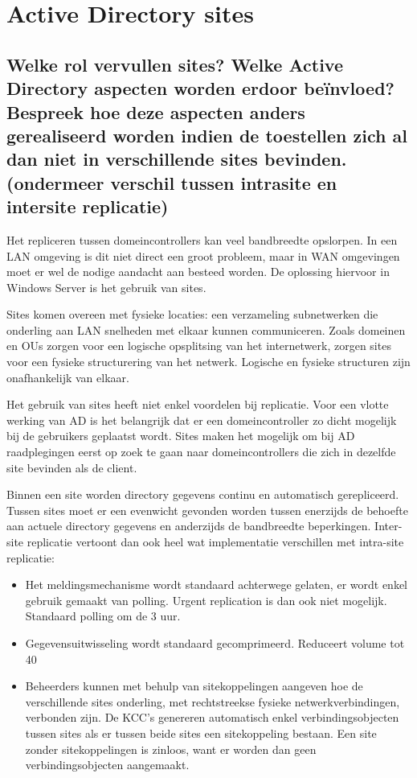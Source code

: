 \chapter{Active Directory sites}

\section{Welke rol vervullen sites? Welke Active Directory aspecten worden
erdoor beïnvloed? Bespreek hoe deze aspecten anders gerealiseerd worden indien
de toestellen zich al dan niet in verschillende sites bevinden. (ondermeer
verschil tussen intrasite en intersite replicatie)}

Het repliceren tussen domeincontrollers kan veel bandbreedte opslorpen. In een
LAN omgeving is dit niet direct een groot probleem, maar in WAN omgevingen moet
er wel de nodige aandacht aan besteed worden. De oplossing hiervoor in Windows
Server is het gebruik van sites.

Sites komen overeen met fysieke locaties: een verzameling subnetwerken die
onderling aan LAN snelheden met elkaar kunnen communiceren. Zoals domeinen en
OUs zorgen voor een logische opsplitsing van het internetwerk, zorgen sites voor
een fysieke structurering van het netwerk. Logische en fysieke structuren zijn
onafhankelijk van elkaar.

Het gebruik van sites heeft niet enkel voordelen bij replicatie. Voor een vlotte
werking van AD is het belangrijk dat er een domeincontroller zo dicht mogelijk
bij de gebruikers geplaatst wordt. Sites maken het mogelijk om bij AD
raadplegingen eerst op zoek te gaan naar domeincontrollers die zich in dezelfde
site bevinden als de client.

Binnen een site worden directory gegevens continu en automatisch gerepliceerd.
Tussen sites moet er een evenwicht gevonden worden tussen enerzijds de behoefte
aan actuele directory gegevens en anderzijds de bandbreedte beperkingen.
Inter-site replicatie vertoont dan ook heel wat implementatie verschillen met
intra-site replicatie:
\begin{itemize}
	\item Het meldingsmechanisme wordt standaard achterwege gelaten, er
		wordt enkel gebruik gemaakt van polling. Urgent replication is
		dan ook niet mogelijk. Standaard polling om de 3 uur.
	\item Gegevensuitwisseling wordt standaard gecomprimeerd. Reduceert
		volume tot 40%
	\item Beheerders kunnen met behulp van sitekoppelingen aangeven hoe de
		verschillende sites onderling, met rechtstreekse fysieke
		netwerkverbindingen, verbonden zijn. De KCC's genereren
		automatisch enkel verbindingsobjecten tussen sites als er tussen
		beide sites een sitekoppeling bestaan. Een site zonder
		sitekoppelingen is zinloos, want er worden dan geen
		verbindingsobjecten aangemaakt.
\end{itemize}

